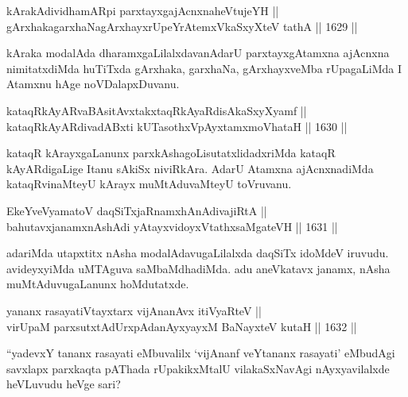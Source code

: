 
\begin{shl}
kArakAdividhamAR\s pi parxtayxgajAcnxnaheVtujeYH || \\
gArxhakagarxhaNagArxhayxrUpeYrAtemxVkaSxyXteV tathA \hfill || 1629 ||  
\end{shl}

\begin{artha}
kAraka modalAda dharamxgaLilalxdavanAdarU parxtayxgAtamxna ajAcnxna nimitatxdiMda huTiTxda gArxhaka, garxhaNa, gArxhayxveMba rUpagaLiMda I Atamxnu hAge noVDalapxDuvanu.
\end{artha}


\begin{shl}
kataqRkAyARvaBAsitAvxtakxtaqRkAyaRdisAkaSxyXyamf || \\
kataqRkAyARdivadABxti kUTasothxV\s pAyxtamxmoVhataH \hfill || 1630 ||  
\end{shl}

\begin{artha}
kataqR kArayxgaLanunx parxkAshagoLisutatxlidadxriMda kataqR kAyARdigaLige Itanu sAkiSx niviRkAra. AdarU Atamxna ajAcnxnadiMda kataqRvinaMteyU kArayx muMtAduvaMteyU toVruvanu.
\end{artha}

\begin{shl}
EkeYveVyamatoV daqSiTxjaRnamxhAnAdivajiRtA || \\
bahutavxjanamxnAshAdi yAtayxvidoyxVtathxsaMgateVH \hfill || 1631 ||  
\end{shl}

\begin{artha}
adariMda utapxtitx nAsha modalAdavugaLilalxda daqSiTx idoMdeV iruvudu. avideyxyiMda uMTAguva saMbaMdhadiMda. adu aneVkatavx janamx, nAsha muMtAduvugaLanunx hoMdutatxde.
\end{artha}


\begin{shl}
yananx rasayatiVtayxtarx vijAnanAvx itiVyaRteV || \\
virUpaM parxsutxtAdUrxpAdanAyxyayxM BaNayxteV kutaH \hfill || 1632 ||  
\end{shl}

\begin{artha}
``yadevxY tananx rasayati eMbuvalilx `vijAnanf veYtananx rasayati' eMbudAgi savxlapx parxkaqta pAThada rUpakikxMtalU vilakaSxNavAgi nAyxyavilalxde heVLuvudu heVge sari?
\end{artha}

